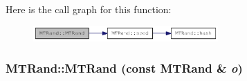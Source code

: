 Here is the call graph for this function:\nopagebreak
\begin{figure}[H]
\begin{center}
\leavevmode
\includegraphics[width=200pt]{classMTRand_a265dc65546e26073c0d5f8787b045a1d_cgraph}
\end{center}
\end{figure}
\hypertarget{classMTRand_aff69d4a4ec88475bab03a295e8fb0f60}{
\subsubsection[{MTRand}]{\setlength{\rightskip}{0pt plus 5cm}MTRand::MTRand (const {\bf MTRand} \& {\em o})}}
\label{classMTRand_aff69d4a4ec88475bab03a295e8fb0f60}


